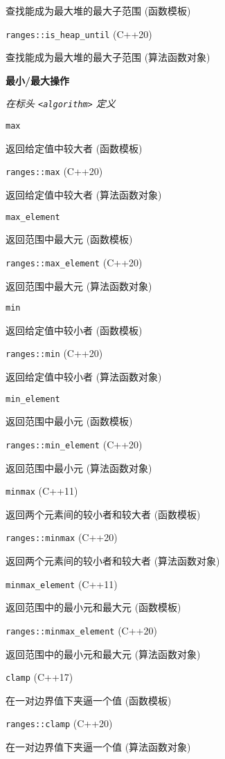 查找能成为最⼤堆的最⼤⼦范围 (函数模板)

\noindent \lstinline{ranges::is_heap_until} (C++20)

查找能成为最⼤堆的最⼤⼦范围 (算法函数对象)

\noindent \textbf{最小/最大操作}

\textit{在标头 \lstinline{<algorithm>} 定义}


\noindent \lstinline{max} 

返回给定值中较⼤者 (函数模板)

\noindent \lstinline{ranges::max} (C++20) 

返回给定值中较⼤者 (算法函数对象)

\noindent \lstinline{max_element}

返回范围中最⼤元 (函数模板)

\noindent \lstinline{ranges::max_element} (C++20)

返回范围中最⼤元 (算法函数对象)

\noindent \lstinline{min}

返回给定值中较⼩者 (函数模板)

\noindent \lstinline{ranges::min} (C++20)

返回给定值中较⼩者 (算法函数对象)

\noindent \lstinline{min_element}

返回范围中最⼩元 (函数模板)

\noindent \lstinline{ranges::min_element} (C++20)

返回范围中最⼩元 (算法函数对象)

\noindent \lstinline{minmax} (C++11)

返回两个元素间的较⼩者和较⼤者 (函数模板)

\noindent \lstinline{ranges::minmax} (C++20)

返回两个元素间的较⼩者和较⼤者 (算法函数对象)

\noindent \lstinline{minmax_element} (C++11)

返回范围中的最⼩元和最⼤元 (函数模板)

\noindent \lstinline{ranges::minmax_element} (C++20)

返回范围中的最⼩元和最⼤元 (算法函数对象)

\noindent \lstinline{clamp} (C++17)

在⼀对边界值下夹逼⼀个值 (函数模板)

\noindent \lstinline{ranges::clamp} (C++20)

在⼀对边界值下夹逼⼀个值 (算法函数对象)

